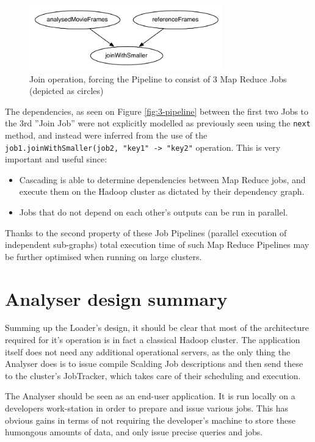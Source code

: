 \begin{figure}[ch!]
  \centering
  \includegraphics[width=0.75\textwidth]{img/second-simplest-pipeline}
  \caption{Join operation, forcing the Pipeline to consist of 3 Map Reduce Jobs (depicted as circles)}
\end{figure}


The dependencies, as seen on Figure \ref{fig:3-pipeline} between the first two Jobs to the 3rd ''Join Job'' were not explicitly modelled as previously seen using the \verb|next| method, and instead were inferred from the use of the \verb|job1.joinWithSmaller(job2, "key1" -> "key2"| operation. This is very important and useful since:

\begin{itemize}
  \item Cascading is able to determine dependencies between Map Reduce jobs, and execute them on the Hadoop cluster as dictated by their dependency graph.
  \item Jobs that do not depend on each other's outputs can be run in parallel.
\end{itemize}

Thanks to the second property of these Job Pipelines (parallel execution of independent sub-graphs) total execution time of such Map Reduce Pipelines may be further optimised when running on large clusters.

\section{Analyser design summary}
Summing up the Loader's design, it should be clear that most of the architecture required for it's operation is in fact a classical Hadoop cluster. The application itself does not need any additional operational servers, as the only thing the Analyser does is to issue compile Scalding Job descriptions and then send these to the cluster's JobTracker, which takes care of their scheduling and execution. 

The Analyser should be seen as an end-user application. It is run locally on a developers work-station in order to prepare and issue various jobs. This has obvious gains in terms of not requiring the developer's machine to store these humongous amounts of data, and only issue precise queries and jobs.







